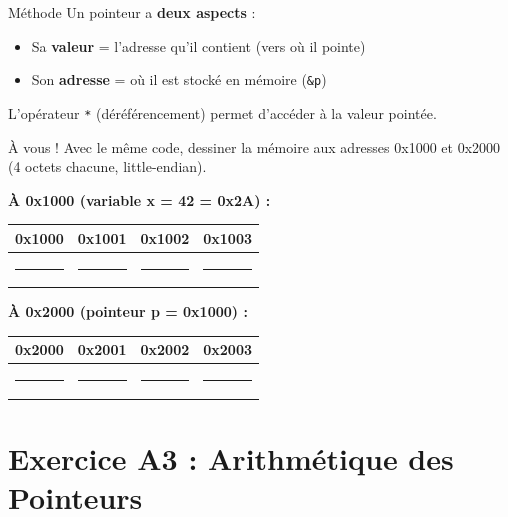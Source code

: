 \documentclass[10pt,a4paper]{article}
\begin{document}
\begin{examplebox}{Méthode}
Un pointeur a \textbf{deux aspects} :
\begin{itemize}
    \item Sa \textbf{valeur} = l'adresse qu'il contient (vers où il pointe)
    \item Son \textbf{adresse} = où il est stocké en mémoire (\texttt{\&p})
\end{itemize}

L'opérateur \texttt{*} (déréférencement) permet d'accéder à la valeur pointée.
\end{examplebox}

\vspace{1em}

\begin{exercicebox}{À vous !}
Avec le même code, dessiner la mémoire aux adresses 0x1000 et 0x2000 (4 octets chacune, little-endian).

\vspace{0.5em}
\textbf{À 0x1000 (variable x = 42 = 0x2A) :}

\begin{center}
\begin{tabular}{|c|c|c|c|}
\hline
0x1000 & 0x1001 & 0x1002 & 0x1003 \\
\hline
\rule{1cm}{0.4pt} & \rule{1cm}{0.4pt} & \rule{1cm}{0.4pt} & \rule{1cm}{0.4pt} \\
\hline
\end{tabular}
\end{center}

\textbf{À 0x2000 (pointeur p = 0x1000) :}

\begin{center}
\begin{tabular}{|c|c|c|c|}
\hline
0x2000 & 0x2001 & 0x2002 & 0x2003 \\
\hline
\rule{1cm}{0.4pt} & \rule{1cm}{0.4pt} & \rule{1cm}{0.4pt} & \rule{1cm}{0.4pt} \\
\hline
\end{tabular}
\end{center}
\end{exercicebox}

\newpage
\section{Exercice A3 : Arithmétique des Pointeurs}
\end{document}
